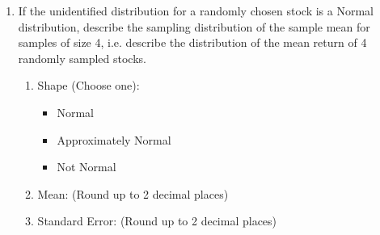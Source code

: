 \begin{enumerate}
\begin{enumerate}
	\end{enumerate}
	\item If the unidentified distribution for a randomly chosen stock is a Normal distribution, describe the sampling distribution of the sample mean for samples of size 4, i.e. describe the distribution of the mean return of 4 randomly sampled  stocks. 
	\begin{enumerate}
		\item Shape (Choose one):
		\begin{itemize}
			\item Normal 
			\item Approximately Normal
			\item Not Normal
		\end{itemize}
		\item Mean: \underline{\hspace{2cm}}    (Round up to 2 decimal places)
		\item Standard Error: \underline{\hspace{2cm}}   (Round up to 2 decimal places)\\
	\end{enumerate}


\end{enumerate}

